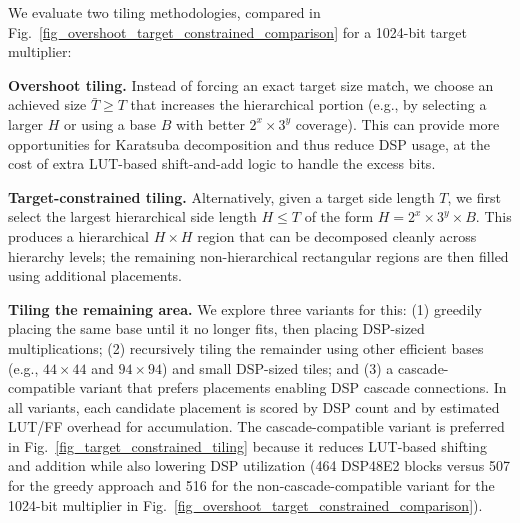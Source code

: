 \documentclass[conference]{IEEEtran}
\begin{document}
We evaluate two tiling methodologies, compared in Fig.~\ref{fig_overshoot_target_constrained_comparison} for a 1024-bit target multiplier:

\noindent\textbf{Overshoot tiling.}
Instead of forcing an exact target size match, we choose an achieved size $\bar{T}\ge T$ that increases the hierarchical portion (e.g., by selecting a larger $H$ or using a base $B$ with better $2^x\times3^y$ coverage).
This can provide more opportunities for Karatsuba decomposition and thus reduce DSP usage, at the cost of extra LUT-based shift-and-add logic to handle the excess bits.

\noindent\textbf{Target-constrained tiling.}
Alternatively, given a target side length $T$, we first select the largest hierarchical side length $H \le T$ of the form $H=2^x\times3^y\times B$.
This produces a hierarchical $H\times H$ region that can be decomposed cleanly across hierarchy levels; the remaining non-hierarchical rectangular regions are then filled using additional placements.

\noindent\textbf{Tiling the remaining area.}
We explore three variants for this:
(1) greedily placing the same base until it no longer fits, then placing DSP-sized multiplications;
(2) recursively tiling the remainder using other efficient bases (e.g., $44\times44$ and $94\times94$) and small DSP-sized tiles; and
(3) a cascade-compatible variant that prefers placements enabling DSP cascade connections.
In all variants, each candidate placement is scored by DSP count and by estimated LUT/FF overhead for accumulation.
The cascade-compatible variant is preferred in Fig.~\ref{fig_target_constrained_tiling} because it reduces LUT-based shifting and addition while also lowering DSP utilization (464 DSP48E2 blocks versus 507 for the greedy approach and 516 for the non-cascade-compatible variant for the 1024-bit multiplier in Fig.~\ref{fig_overshoot_target_constrained_comparison}).
\end{document}

